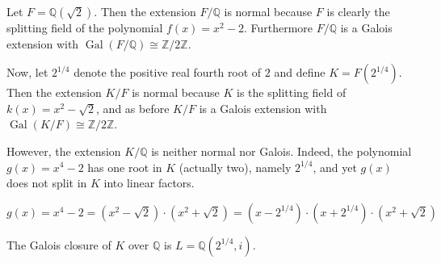 \documentclass[12pt]{article}
\newcommand{\Ints}{\mathbb{Z}}
\newcommand{\Rats}{\mathbb{Q}}
\newcommand{\Gal}{\operatorname{Gal}}
\begin{document}
Let $F=\Rats(\sqrt{2})$. Then the extension $F/\Rats$ is normal because $F$ is clearly the splitting field of the polynomial $f(x)=x^2-2$. Furthermore $F/\Rats$ is a Galois extension with $\Gal(F/\Rats)\cong \Ints/2\Ints$.

Now, let $2^{1/4}$ denote the positive real fourth root of $2$ and define $K=F(2^{1/4})$. Then the extension $K/F$ is normal because $K$ is the splitting field of $k(x)=x^2-\sqrt{2}$, and as before $K/F$ is a Galois extension with $\Gal(K/F)\cong \Ints/2\Ints$.

However, the extension $K/\Rats$ is neither normal nor Galois. Indeed, the polynomial $g(x)=x^4-2$ has one root in $K$ (actually two), namely $2^{1/4}$, and yet $g(x)$ does not split in $K$ into linear factors.

$$g(x)=x^4-2=(x^2-\sqrt{2})\cdot(x^2+\sqrt{2})=(x-2^{1/4})\cdot(x+2^{1/4})\cdot(x^2+\sqrt{2})$$

The Galois closure of $K$ over $\Rats$ is $L=\Rats(2^{1/4},i)$.
\end{document}

